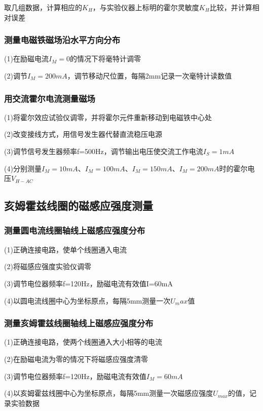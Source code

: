 \documentclass[12pt,a4paper]{article}
\begin{document}
        取几组数据，计算相应的$K_H$，与实验仪器上标明的霍尔灵敏度$K_H$比较，并计算相对误差

        \subsubsection{测量电磁铁磁场沿水平方向分布}
        (1)在励磁电流$I_M=0$的情况下将毫特计调零\par
        (2)调节$I_M=200mA$，调节移动尺位置，每隔2mm记录一次毫特计读数值

        \subsubsection{用交流霍尔电流测量磁场}
        (1)将霍尔效应试验仪调零，并将霍尔元件重新移动到电磁铁中心处\par
        (2)改变接线方式，用信号发生器代替直流稳压电源\par
        (3)调节信号发生器频率f=500Hz，调节输出电压使交流工作电流$I_S=1mA$\par
        (4)分别测量$I_M=10mA$、$I_M=100mA$、$I_M=150mA$、$I_M=200mA$时的霍尔电压$V_{H-AC}$

    \subsection{亥姆霍兹线圈的磁感应强度测量}
        \subsubsection{测量圆电流线圈轴线上磁感应强度分布}
        (1)正确连接电路，使单个线圈通入电流\par
        (2)将磁感应强度实验仪调零\par
        (3)调节电位器频率f=120Hz，励磁电流有效值I=60mA\par
        (4)以圆电流线圈中心为坐标原点，每隔5mm测量一次$U_max$值

        \subsubsection{测量亥姆霍兹线圈轴线上磁感应强度分布}
        (1)正确连接电路，使两个线圈通入大小相等的电流\par
        (2)在励磁电流为零的情况下将磁感应强度清零\par
        (3)调节电位器频率f=120Hz，励磁电流有效值$I_M=60mA$\par
        (4)以亥姆霍兹线圈中心为坐标原点，每隔5mm测量一次磁感应强度$U_{max}$的值，记录实验数据
\end{document}

